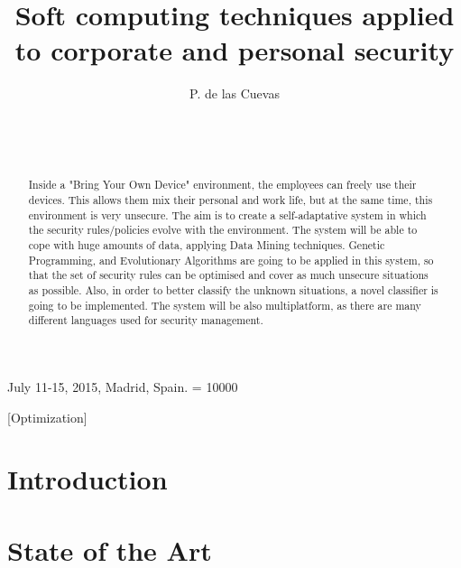 \documentclass{sig-alternate}
\begin{document}
 {July 11-15, 2015, Madrid, Spain.}
\widowpenalty = 10000

\title{Soft computing techniques applied to corporate and personal security}

\author{
\alignauthor
P. de las Cuevas\\
\\
\\
\\
}

\maketitle

\begin{abstract}
Inside a "Bring Your Own Device" environment, the employees can freely use their devices. This allows them mix their personal and work life, but at the same time, this environment is very unsecure. The aim is to create a self-adaptative system in which the security rules/policies evolve with the environment. The system will be able to cope with huge amounts of data, applying Data Mining techniques.
Genetic Programming, and Evolutionary Algorithms are going to be applied in this system, so that the set of security rules can be optimised and cover as much unsecure situations as possible. Also, in order to better classify the unknown situations, a novel classifier is going to be implemented.
The system will be also multiplatform, as there are many different languages used for security management.
\end{abstract}

[Optimization]

\terms{}

\keywords{}

%
%
\section{Introduction}
\label{sec:intro}

%
%
\section{State of the Art}
\label{sec:sota}
\end{document}
